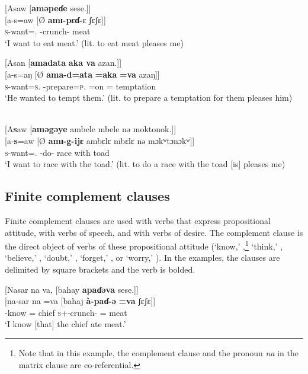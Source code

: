 \ea \label{ex:12:11}
{}[Asaw  [\textbf{aməpeɗe}  sese.]]\\
\gll  {}[a-s=aw [Ø  \textbf{amɪ-pɛɗ{}-}ɛ ʃɛʃɛ]]\\
      \textsc{s}-want={\oneS}.{\IO} {} {\DEP}-crunch-{\CL}  meat\\
\glt  ‘I want to eat meat.’ (lit. to eat meat pleases me) 
\z 

\ea \label{ex:12:12}
{}[Asan  [\textbf{amadata}  \textbf{aka  va}  azan.]]\\
\gll  {}[a-s=aŋ     [Ø   \textbf{ama-d=ata} \textbf{=aka} \textbf{=va} azaŋ]]\\
      \textsc{s}-want=\textsc{s}.{\IO}  {}  {\DEP}-prepare=\textsc{p}.{\IO} =on     ={\PRF}  temptation\\
\glt  ‘He wanted to tempt them.’ (lit. to prepare a temptation for them pleases him)
\z 

\ea \label{ex:12:13}
\\
{}[A\textbf{s}aw  [\textbf{aməgəye}  ambele  mbele  nə  moktonok.]]\\
\gll  {}[a-\textbf{s}=aw  [Ø \textbf{amɪ-g-ijɛ}    {ambɛlɛ mbɛlɛ}  nə  mɔkʷtɔnɔkʷ]]\\
      \textsc{s}-want={\oneS}.{\IO}  {}  {\DEP}-do-{\CL}  race    with  toad\\
\glt  ‘I want to race with the toad.’ (lit. to do a race with the toad [is] pleases me)
\z 

\subsection{Finite complement clauses}\label{sec:12.1.2}
\hypertarget{RefHeading1213381525720847}{}
Finite complement clauses are used with verbs that express propositional attitude, with verbs of speech, and with verbs of desire. The complement clause is the direct object of verbs of these propositional attitude  (‘know,’ ,\footnote{Note that in this example, the complement clause and the \DO pronoun \textit{na} in the matrix clause are co-referential.} ‘think,’ , ‘believe,’ , ‘doubt,’ , ‘forget,’ , or ‘worry,’ ). In the examples, the clauses are delimited by square brackets and the verb is bolded.


\ea \label{ex:12:14}
{}[Nasar  na  va,  [bahay  \textbf{apaɗəva}  sese.]] \\
\gll  {}[na-sar na   =va   [bahaj   \textbf{à-paɗ-ə}    \textbf{=va}   ʃɛʃɛ]]\\
      {\oneS}-know  {\DO}  ={\PRF}  chief  \textsc{s}+{\PFV}-crunch-{\CL}  ={\PRF}  meat\\
\glt  ‘I know [that] the chief ate meat.’ 
\z 

